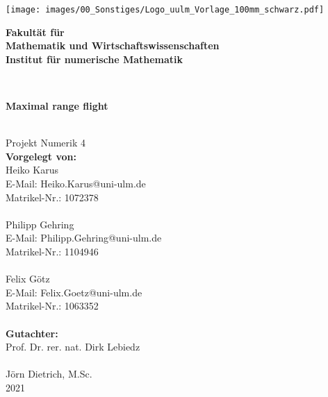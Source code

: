 \documentclass[
a4paper,
11pt,
headsepline,           %
oneside,               %
numbers=noenddot,	   %
bibliography=totoc,    %
]{scrbook}
\makeatletter
\newcommand{\Heiko}{Heiko Karus}
\newcommand{\Philipp}{Philipp Gehring}
\newcommand{\Felix}{Felix Götz}
\newcommand{\Hemail}{Heiko.Karus@uni-ulm.de}
\newcommand{\Pemail}{Philipp.Gehring@uni-ulm.de}
\newcommand{\Femail}{Felix.Goetz@uni-ulm.de}
\newcommand{\Hmatnr}{1072378}
\newcommand{\Pmatnr}{1104946}
\newcommand{\Fmatnr}{1063352}
\newcommand{\titel}{Maximal range flight}
\newcommand{\jahr}{2021}
\newcommand{\gutachterA}{Prof. Dr. rer. nat. Dirk Lebiedz}
\newcommand{\gutachterB}{Jörn Dietrich, M.Sc.}
\newcommand{\fakultaet}{Mathematik und Wirtschaftswissenschaften}
\newcommand{\institut}{Institut für numerische Mathematik}
\makeatother
\begin{document}

\frontmatter

\thispagestyle{empty}
\begin{addmargin*}[4mm]{-10mm}

\hfill
\texttt{[image: images/00\_Sonstiges/Logo\_uulm\_Vorlage\_100mm\_schwarz.pdf]}\\[2em]



{\footnotesize
\hspace*{130mm}\parbox[t]{35mm}{
\bfseries Fakultät für\\
\fakultaet\\
\mdseries \institut
}\\[2cm]

\parbox{140mm}{\bfseries \LARGE \titel}\\[2.5em]
{\footnotesize Projekt Numerik 4}\\[2em]

{\footnotesize \bfseries Vorgelegt von:}\\
{\footnotesize \Heiko \\ E-Mail: \Hemail \\ Matrikel-Nr.: \Hmatnr}\\ \\%
{\footnotesize \Philipp \\ E-Mail: \Pemail \\ Matrikel-Nr.: \Pmatnr}\\ \\%
{\footnotesize \Felix \\ E-Mail: \Femail \\ Matrikel-Nr.: \Fmatnr}\\ \\[2em]

{\footnotesize \bfseries Gutachter:}\\                     
{\footnotesize \gutachterA}\\ \\%
{\footnotesize \gutachterB}\\[2em]

{\footnotesize \jahr}
}
\end{addmargin*}
\end{document}
